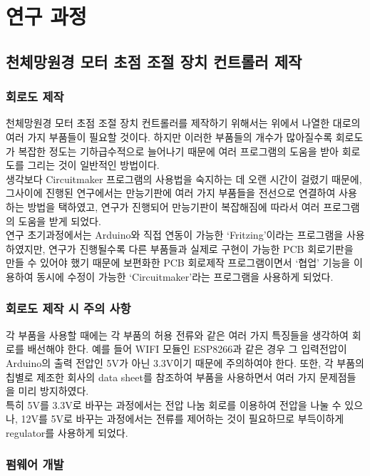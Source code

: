 \section{연구 과정}

\subsection{천체망원경 모터 초점 조절 장치 컨트롤러 제작}

\subsubsection{회로도 제작}

천체망원경 모터 초점 조절 장치 컨트롤러를 제작하기 위해서는 위에서 나열한 대로의 여러 가지 부품들이 필요할 것이다. 하지만 이러한 부품들의 개수가 많아질수록 회로도가 복잡한 정도는 기하급수적으로 늘어나기 때문에 여러 프로그램의 도움을 받아 회로도를 그리는 것이 일반적인 방법이다.\\
생각보다 Circuitmaker 프로그램의 사용법을 숙지하는 데 오랜 시간이 걸렸기 때문에, 그사이에 진행된 연구에서는 만능기판에 여러 가지 부품들을 전선으로 연결하여 사용하는 방법을 택하였고, 연구가 진행되어 만능기판이 복잡해짐에 따라서 여러 프로그램의 도움을 받게 되었다.\\
연구 초기과정에서는 Arduino와 직접 연동이 가능한 ‘Fritzing’이라는 프로그램을 사용하였지만, 연구가 진행될수록 다른 부품들과 실제로 구현이 가능한 PCB 회로기판을 만들 수 있어야 했기 때문에 보편화한 PCB 회로제작 프로그램이면서 ‘협업’ 기능을 이용하여 동시에 수정이 가능한 ‘Circuitmaker’라는 프로그램을 사용하게 되었다.

\subsubsection{회로도 제작 시 주의 사항}

각 부품을 사용할 때에는 각 부품의 허용 전류와 같은 여러 가지 특징들을 생각하여 회로를 배선해야 한다. 예를 들어 WIFI 모듈인 ESP8266과 같은 경우 그 입력전압이 Arduino의 출력 전압인 5V가 아닌 3.3V이기 때문에 주의하여야 한다. 또한, 각 부품의 칩별로 제조한 회사의 data sheet를 참조하여 부품을 사용하면서 여러 가지 문제점들을 미리 방지하였다.\\
특히 5V를 3.3V로 바꾸는 과정에서는 전압 나눔 회로를 이용하여 전압을 나눌 수 있으나, 12V를 5V로 바꾸는 과정에서는 전류를 제어하는 것이 필요하므로 부득이하게 regulator를 사용하게 되었다.


\subsubsection{펌웨어 개발}

